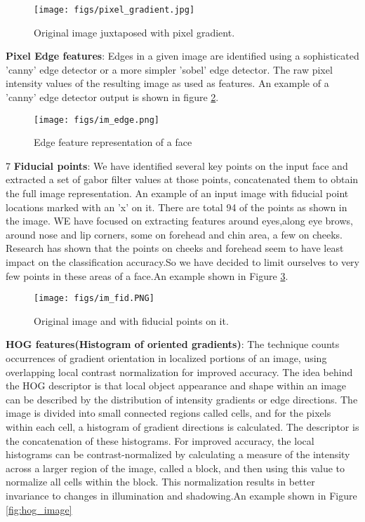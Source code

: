\documentclass[10pt,twocolumn,letterpaper]{article}
\begin{document}
\begin{figure}[h]
\texttt{[image: figs/pixel\_gradient.jpg]}
\caption{Original image juxtaposed with pixel gradient.}
\label{fig:grad_image}
\end{figure}


\textbf{Pixel Edge features}: Edges in a given image are identified using a sophisticated 'canny' edge detector or a more simpler 'sobel' edge detector. The raw pixel intensity values of the resulting image as used as features. An example of a 'canny' edge detector output is shown in figure \ref{fig:edge_image}. \newline

\begin{figure}[h]
\texttt{[image: figs/im\_edge.png]}
\caption{Edge feature representation of a face}
\label{fig:edge_image}
\end{figure}
7
\textbf{Fiducial points}: We have identified several key points on the input face and extracted a set of gabor filter values at those points, concatenated them to obtain the full image representation.  An example of an input image with fiducial point locations marked with an 'x' on it. There are total 94 of the points as shown in the image. WE have focused on extracting features around eyes,along eye brows, around nose and lip corners, some on forehead and chin area, a few on cheeks. Research has shown that the points on cheeks and forehead seem to have least impact on the classification accuracy.So we have decided to limit ourselves to very few points in these areas of a face.An example shown in Figure \ref{fig:fid_image}.  \newline

\begin{figure}[h]
\texttt{[image: figs/im\_fid.PNG]}
\caption{Original image and with fiducial points on it.}
\label{fig:fid_image}
\end{figure}


\textbf{HOG features(Histogram of oriented gradients)}: The technique counts occurrences of gradient orientation in localized portions of an image, using overlapping local contrast normalization for improved accuracy. The idea behind the HOG descriptor is that local object appearance and shape within an image can be described by the distribution of intensity gradients or edge directions. The image is divided into small connected regions called cells, and for the pixels within each cell, a histogram of gradient directions is calculated. The descriptor is the concatenation of these histograms. For improved accuracy, the local histograms can be contrast-normalized by calculating a measure of the intensity across a larger region of the image, called a block, and then using this value to normalize all cells within the block. This normalization results in better invariance to changes in illumination and shadowing.An example shown in Figure \ref{fig:hog_image} \newline
\end{document}
